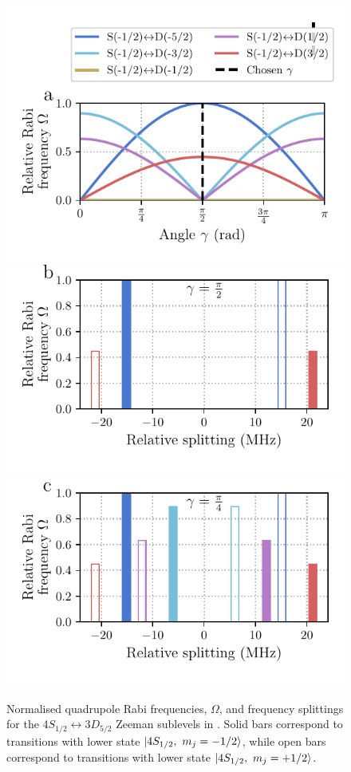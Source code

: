     \begin{figure}
        \vspace*{-0.5cm}
        \begin{center}
        \noindent\includegraphics[width=0.65\linewidth]{
            figures/pdf_figure/qp_gamma.pdf
            }
        \vspace*{-0.5cm}
        \noindent\includegraphics[width=0.65\linewidth]{
            figures/pdf_figure/qp_transition_spectrum_0.50.pdf
            }
        \vspace*{-0.5cm}
        \noindent\includegraphics[width=0.65\linewidth]{
            figures/pdf_figure/qp_transition_spectrum_0.25.pdf
            }
        \end{center}
        \vspace*{-0.5cm}
        \caption{
            Normalised quadrupole Rabi frequencies, $\Omega$, and frequency splittings for the $4S_{1/2} \leftrightarrow 3D_{5/2}$ Zeeman sublevels in \ca. Solid bars correspond to transitions with lower state $\ket{4S_{1/2},~m_j = -1/2}$, while open bars correspond to transitions with lower state $\ket{4S_{1/2},~m_j = +1/2}$.
}
\end{figure}
